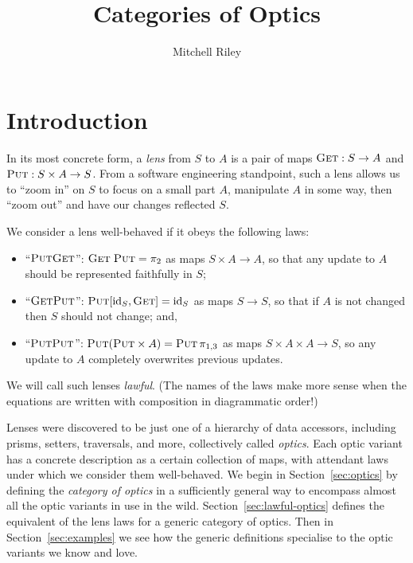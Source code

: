 \documentclass[11pt,a4paper]{article}
\title{Categories of Optics}
\author{Mitchell Riley}
\affil{Wesleyan University \\ \texttt{mvriley@wesleyan.edu}}
\theoremstyle{plain}
\theoremstyle{definition}
\newcommand{\id}{\mathrm{id}}
\newcommand{\fget}{\textsc{Get}}
\newcommand{\fput}{\textsc{Put}}
\newcommand{\todo}[1]{\textcolor{red}{\small #1}}
\begin{document}
\maketitle

\section{Introduction}


In its most concrete form, a \emph{lens} from $S$ to $A$ is a pair of maps $\fget : S \to A$ and $\fput : S \times A \to S$. From a software engineering standpoint, such a lens allows us to ``zoom in'' on $S$ to focus on a small part $A$, manipulate $A$ in some way, then ``zoom out'' and have our changes reflected $S$. 

We consider a lens well-behaved if it obeys the following laws: 
\begin{itemize}
\item ``$\fput\fget$'': $\fget \; \fput = \pi_2$ as maps $S \times A \to A$, so that any update to $A$ should be represented faithfully in $S$;
\item ``$\fget\fput$'': $\fput [\id_S, \fget] = \id_S$ as maps $S \to S$, so that if $A$ is not changed then $S$ should not change; and,
\item ``$\fput\fput$'': $\fput (\fput \times A) = \fput \, \pi_{1, 3}$ as maps $S \times A \times A \to S$, so any update to $A$ completely overwrites previous updates.
\end{itemize}
We will call such lenses \emph{lawful}. (The names of the laws make more sense when the equations are written with composition in diagrammatic order!)

Lenses were discovered to be just one of a hierarchy of data accessors, including prisms, setters, traversals, and more, collectively called \emph{optics}. Each optic variant has a concrete description as a certain collection of maps, with attendant laws under which we consider them well-behaved. We begin in Section~\ref{sec:optics} by defining the \emph{category of optics} in a sufficiently general way to encompass almost all the optic variants in use in the wild. Section~\ref{sec:lawful-optics} defines the equivalent of the lens laws for a generic category of optics. Then in Section~\ref{sec:examples} we see how the generic definitions specialise to the optic variants we know and love.
\end{document}
